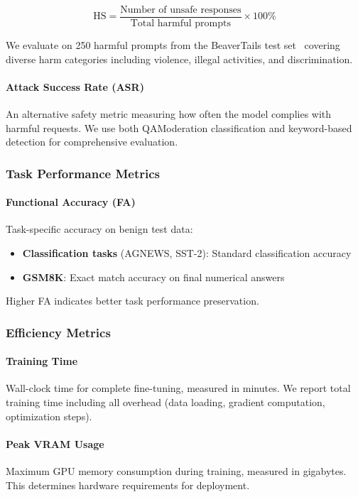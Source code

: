 \begin{equation}
\text{HS} = \frac{\text{Number of unsafe responses}}{\text{Total harmful prompts}} \times 100\%
\end{equation}

We evaluate on 250 harmful prompts from the BeaverTails test set~\cite{ji2024beavertails} covering diverse harm categories including violence, illegal activities, and discrimination.

\paragraph{Attack Success Rate (ASR)}
An alternative safety metric measuring how often the model complies with harmful requests. We use both QAModeration classification and keyword-based detection for comprehensive evaluation.

\subsubsection{Task Performance Metrics}

\paragraph{Functional Accuracy (FA)}
Task-specific accuracy on benign test data:
\begin{itemize}
    \item \textbf{Classification tasks} (AGNEWS, SST-2): Standard classification accuracy
    \item \textbf{GSM8K}: Exact match accuracy on final numerical answers
\end{itemize}

Higher FA indicates better task performance preservation.

\subsubsection{Efficiency Metrics}

\paragraph{Training Time}
Wall-clock time for complete fine-tuning, measured in minutes. We report total training time including all overhead (data loading, gradient computation, optimization steps).

\paragraph{Peak VRAM Usage}
Maximum GPU memory consumption during training, measured in gigabytes. This determines hardware requirements for deployment.

